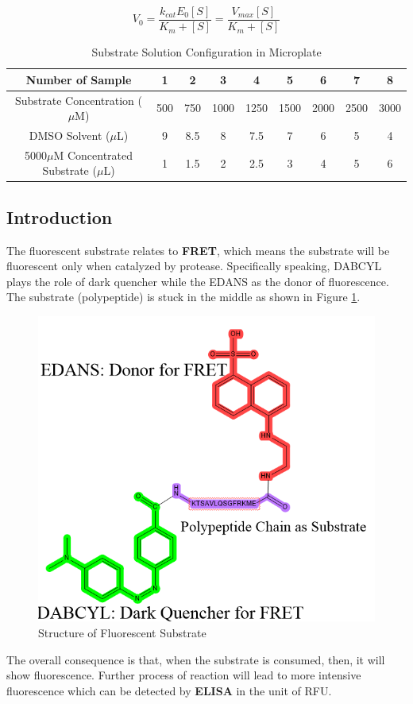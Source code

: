 \documentclass{report}
\begin{document}
$$
V_0 =\frac{k_{cat}E_0[S]}{K_m+[S]}=\frac{V_{max}[S]}{K_m+[S]}
$$
\begin{table}
    \centering
    \caption{Substrate Solution Configuration in Microplate}
    
    \begin{tabular}{|c|c|c|c|c|c|c|c|c|} \hline
        Number of Sample&1&2&3&4&5&6&7&8 \\ \hline
        Substrate Concentration ($\mu$M)&500&750&1000&1250&1500&2000&2500&3000 \\ \hline
        DMSO Solvent ($\mu$L)& 9&8.5&8&7.5&7&6&5&4\\ \hline
        5000$\mu$M Concentrated Substrate ($\mu$L)&1&1.5&2&2.5&3&4&5&6 \\ \hline
    \end{tabular}
    \label{Substrate Solution Configuration in Microplate}
\end{table}

\subsection{Introduction}
The fluorescent substrate relates to \textbf{FRET}, which means the substrate will be fluorescent only when catalyzed by protease.
Specifically speaking, DABCYL plays the role of dark quencher\cite{Quencher} while the EDANS\cite{EDANS} as the donor of fluorescence.
The substrate (polypeptide) is stuck in the middle as shown in Figure \ref{Structure of Fluorescent Substrate}.
\begin{figure}
    \centering
    \includegraphics[width=0.5\linewidth]{../Figures/fluorescent substrate.png}
    \caption{Structure of Fluorescent Substrate}
    \label{Structure of Fluorescent Substrate}
\end{figure}

The overall consequence is that, when the substrate is consumed, then, it will show fluorescence.
Further process of reaction will lead to more intensive fluorescence which can be detected by \textbf{ELISA} in the unit of RFU.
\end{document}
